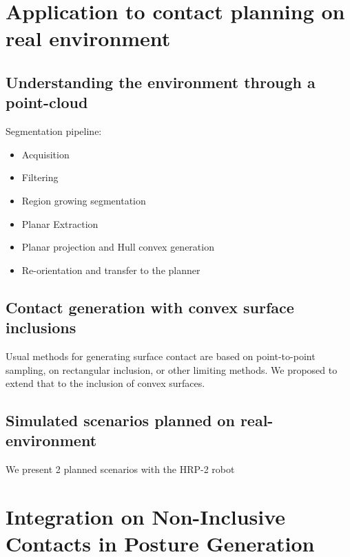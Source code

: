 
\section{Application to contact planning on real environment}
\subsection{Understanding the environment through a point-cloud}
Segmentation pipeline:
\begin{itemize}
  \item Acquisition
  \item Filtering
  \item Region growing segmentation
  \item Planar Extraction
  \item Planar projection and Hull convex generation
  \item Re-orientation and transfer to the planner
\end{itemize}

\subsection{Contact generation with convex surface inclusions}
Usual methods for generating surface contact are based on point-to-point sampling, on rectangular inclusion, or other limiting methods. We proposed to extend that to the inclusion of convex surfaces.

\subsection{Simulated scenarios planned on real-environment}
We present 2 planned scenarios with the HRP-2 robot




\section{Integration on Non-Inclusive Contacts in Posture Generation}

